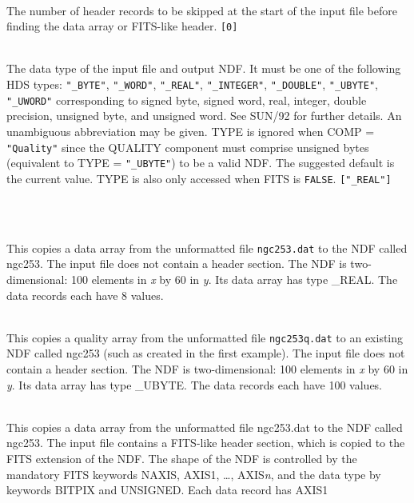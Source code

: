\documentclass[twoside,11pt]{article}
\newcommand{\htmlref}[2]{#1}
\newcommand{\xref}[3]{#1}
\newlength{\sstexampleslength}
\newcommand{\sstexamples}[1]{
   \goodbreak
   \item[Examples:] \mbox{} \\
   \vspace{-3.5ex}
   \begin{description}
      #1
   \end{description}
}
\newcommand{\sstsubsection}[1]{ \item[{#1}] \mbox{} \\}
\newcommand{\sstexamplesubsection}[2]{\sloppy
\item[\parbox{\sstexampleslength}{\ssttt #1}] \mbox{} \vspace{0.5ex}
\\ #2 \vspace{1.0ex}}
\newcommand{\sstexamples}[1]{
   \item[\vspace{0.35ex}\htmlref{Examples:\vspace{-0.5ex}}{app_example}]
      \begin{description}
         #1
      \end{description}
      \\
   }
\newcommand{\sstsubsection}[1]{\item[{#1}]}
\newcommand{\sstexamplesubsection}[2]{
   \vspace{-1.0ex} \item[{\ssttt #1}] #2 \vspace{0.2ex}}
\begin{document}
{{{      }
      \sstsubsection{
         SKIP = INTEGER (Read)
      }{
         The number of header records to be skipped at the start of the
         input file before finding the data array or FITS-like header.
         \texttt{[0]}
      }
      \sstsubsection{
         TYPE = LITERAL (Read)
      }{
         The data type of the input file and output NDF.  
         It must be one of the
         following HDS types: \texttt{"\_BYTE"}, \texttt{"\_WORD"},
         \texttt{"\_REAL"},
         \texttt{"\_INTEGER"}, \texttt{"\_DOUBLE"}, \texttt{"\_UBYTE"},
         \texttt{"\_UWORD"} corresponding to signed byte,
         signed word, real, integer, double precision, unsigned byte,
         and unsigned word.  See \xref{SUN/92}{sun92}{} for further details.
         An unambiguous abbreviation may be given.  TYPE is ignored when
         COMP = \texttt{"Quality"} since the QUALITY component must comprise
         unsigned bytes (equivalent to TYPE = \texttt{"\_UBYTE"}) to be a valid
         NDF. The suggested default is the current value.  TYPE is also only
         accessed when FITS is \texttt{FALSE}. \texttt{["\_REAL"]}
      }
   }
   \sstexamples{
      \sstexamplesubsection{
         unf2ndf ngc253.dat ngc253 shape=[100,60] noperec=8
      }{
         This copies a data array from the unformatted file \texttt{ngc253.dat}
         to the NDF called ngc253.  The input file does not contain a
         header section.  The NDF is two-dimensional: 100 elements in \textit{x}
         by 60 in \textit{y}.  Its data array has type \_REAL.  The data records
         each have 8 values.
      }
      \sstexamplesubsection{
         unf2ndf ngc253q.dat ngc253 q 100 shape=[100,60]
      }{
         This copies a quality array from the unformatted file
         \texttt{ngc253q.dat} to an existing NDF called ngc253 (such as 
         created in the first example).  The input file does not contain a 
         header section.  The NDF is two-dimensional: 100 elements in 
         \textit{x} by 60 in \textit{y}.  
         Its data array has type \_UBYTE.
         The data records each have 100 values.
      }
      \sstexamplesubsection{
         unf2ndf ngc253.dat ngc253 fits noperec=!
      }{
         This copies a data array from the unformatted file ngc253.dat
         to the NDF called ngc253.  The input file contains a FITS-like
         header section, which is copied to the FITS extension of the
         NDF.  The shape of the NDF is controlled by the mandatory FITS
         keywords NAXIS, AXIS1, \ldots, AXIS{\em{n}}, and the data type by
         keywords BITPIX and UNSIGNED.  Each data record has AXIS1
}}}
\end{document}
